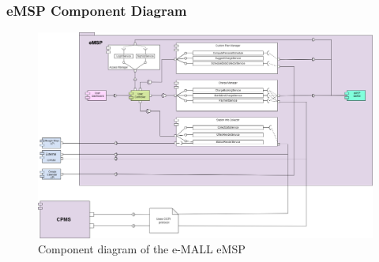 \documentclass[12pt]{report}
\begin{document}
\subsubsection{eMSP Component Diagram}
\begin{figure}[h]
    \hspace*{-2.5cm} 
    \centering
    \includegraphics[width = 1.3\textwidth]{assets/component_emsp.png}
    \caption{Component diagram of the e-MALL eMSP}
    \label{fig:my_label7}
\end{figure}
\end{document}
